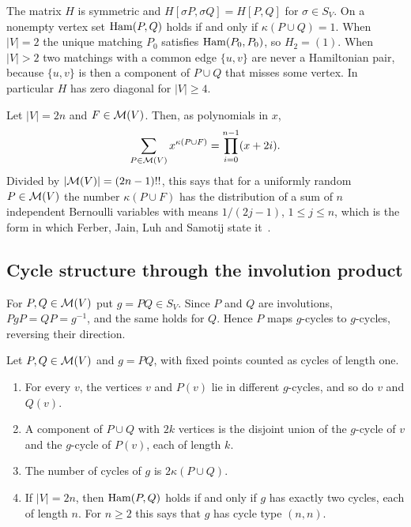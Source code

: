 The matrix $H$ is symmetric and $H[\sigma P,\sigma Q]=H[P,Q]$ for $\sigma\in S_V$. On a nonempty vertex set $\operatorname{Ham}(P,Q)$ holds if and only if $\kappa(P\cup Q)=1$. When $|V|=2$ the unique matching $P_0$ satisfies $\operatorname{Ham}(P_0,P_0)$, so $H_2=(1)$. When $|V|>2$ two matchings with a common edge $\{u,v\}$ are never a Hamiltonian pair, because $\{u,v\}$ is then a component of $P\cup Q$ that misses some vertex. In particular $H$ has zero diagonal for $|V|\ge 4$.

\begin{remark}\label{rem:moment}
Let $|V|=2n$ and $F\in\mathcal{M}(V)$. Then, as polynomials in $x$,
\[
\sum_{P\in\mathcal{M}(V)}x^{\kappa(P\cup F)}=\prod_{i=0}^{n-1}(x+2i).
\]
Divided by $|\mathcal{M}(V)|=(2n-1)!!$, this says that for a uniformly random $P\in\mathcal{M}(V)$ the number $\kappa(P\cup F)$ has the distribution of a sum of $n$ independent Bernoulli variables with means $1/(2j-1)$, $1\le j\le n$, which is the form in which Ferber, Jain, Luh and Samotij state it~\cite[proof of Lemma~5.2]{FJLS19}. %
\end{remark}

\subsection{Cycle structure through the involution product}

For $P,Q\in\mathcal{M}(V)$ put $g=PQ\in S_V$. Since $P$ and $Q$ are involutions, $PgP=QP=g^{-1}$, and the same holds for $Q$. Hence $P$ maps $g$-cycles to $g$-cycles, reversing their direction.

\begin{proposition}\label{prop:invprod}
Let $P,Q\in\mathcal{M}(V)$ and $g=PQ$, with fixed points counted as cycles of length one.
\begin{enumerate}
\item For every $v$, the vertices $v$ and $P(v)$ lie in different $g$-cycles, and so do $v$ and $Q(v)$.
\item A component of $P\cup Q$ with $2k$ vertices is the disjoint union of the $g$-cycle of $v$ and the $g$-cycle of $P(v)$, each of length $k$.
\item The number of cycles of $g$ is $2\kappa(P\cup Q)$.
\item If $|V|=2n$, then $\operatorname{Ham}(P,Q)$ holds if and only if $g$ has exactly two cycles, each of length $n$. For $n\ge2$ this says that $g$ has cycle type $(n,n)$.
\end{enumerate}
\end{proposition}

